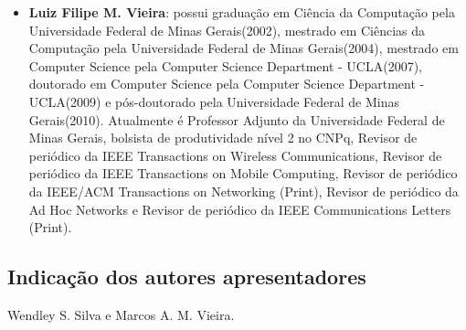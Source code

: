 \documentclass{SBCbookchapter}
\begin{document}
\begin{itemize}
\item \textbf{Luiz Filipe M. Vieira}: possui graduação em Ciência da Computação pela Universidade Federal de Minas Gerais(2002), mestrado em Ciências da Computação pela Universidade Federal de Minas Gerais(2004), mestrado em Computer Science pela Computer Science Department - UCLA(2007), doutorado em Computer Science pela Computer Science Department - UCLA(2009) e pós-doutorado pela Universidade Federal de Minas Gerais(2010). Atualmente é Professor Adjunto da Universidade Federal de Minas Gerais, bolsista de produtividade nível 2 no CNPq, Revisor de periódico da IEEE Transactions on Wireless Communications, Revisor de periódico da IEEE Transactions on Mobile Computing, Revisor de periódico da IEEE/ACM Transactions on Networking (Print), Revisor de periódico da Ad Hoc Networks e Revisor de periódico da IEEE Communications Letters (Print).

\end{itemize}

\subsection{Indicação dos autores apresentadores}
Wendley S. Silva e Marcos A. M. Vieira.




\end{document}
